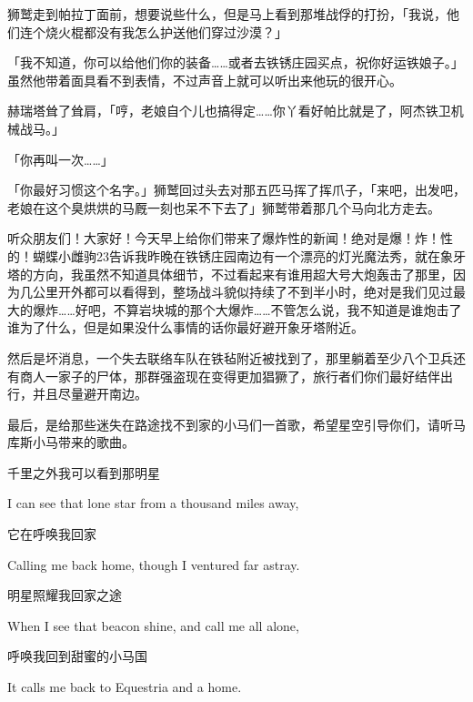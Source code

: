 狮鹫走到帕拉丁面前，想要说些什么，但是马上看到那堆战俘的打扮，「我说，他们连个烧火棍都没有我怎么护送他们穿过沙漠？」

「我不知道，你可以给他们你的装备……或者去铁锈庄园买点，祝你好运铁娘子。」虽然他带着面具看不到表情，不过声音上就可以听出来他玩的很开心。

赫瑞塔耸了耸肩，「哼，老娘自个儿也搞得定……你丫看好帕比就是了，阿杰铁卫机械战马。」

「你再叫一次……」

「你最好习惯这个名字。」狮鹫回过头去对那五匹马挥了挥爪子，「来吧，出发吧，老娘在这个臭烘烘的马厩一刻也呆不下去了」狮鹫带着那几个马向北方走去。

\horizonline

{\rt 听众朋友们！大家好！今天早上给你们带来了爆炸性的新闻！绝对是爆！炸！性的！蝴蝶小雌驹23告诉我昨晚在铁锈庄园南边有一个漂亮的灯光魔法秀，就在象牙塔的方向，我虽然不知道具体细节，不过看起来有谁用超大号大炮轰击了那里，因为几公里开外都可以看得到，整场战斗貌似持续了不到半小时，绝对是我们见过最大的爆炸……好吧，不算岩块城的那个大爆炸……不管怎么说，我不知道是谁炮击了谁为了什么，但是如果没什么事情的话你最好避开象牙塔附近。

然后是坏消息，一个失去联络车队在铁毡附近被找到了，那里躺着至少八个卫兵还有商人一家子的尸体，那群强盗现在变得更加猖獗了，旅行者们你们最好结伴出行，并且尽量避开南边。

最后，是给那些迷失在路途找不到家的小马们一首歌，希望星空引导你们，请听马库斯小马带来的歌曲。}


\begin{song}
    千里之外我可以看到那明星
    
    I can see that lone star from a thousand miles away,
    
    \medskip

    它在呼唤我回家
    
    Calling me back home, though I ventured far astray.
    
    \medskip

    明星照耀我回家之途
    
    When I see that beacon shine, and call me all alone,
    
    \medskip

    呼唤我回到甜蜜的小马国
    
    It calls me back to Equestria and a home.
\end{song}

\horizonline


